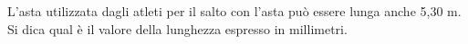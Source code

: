 L'asta utilizzata dagli atleti per il salto 
con l'asta può essere lunga anche 5,30 m. 
Si dica qual è il valore della lunghezza espresso in millimetri.
